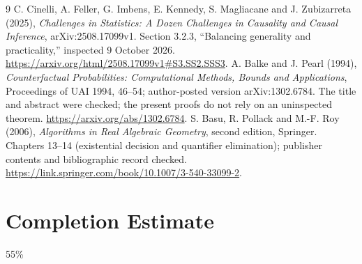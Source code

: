 \documentclass[11pt]{article}
\theoremstyle{remark}
\begin{document}
\begin{thebibliography}{9}
 C. Cinelli, A. Feller, G. Imbens, E. Kennedy, S. Magliacane and J. Zubizarreta (2025), \emph{Challenges in Statistics: A Dozen Challenges in Causality and Causal Inference}, arXiv:2508.17099v1. Section 3.2.3, ``Balancing generality and practicality,'' inspected 9 October 2026. \url{https://arxiv.org/html/2508.17099v1#S3.SS2.SSS3}.
 A. Balke and J. Pearl (1994), \emph{Counterfactual Probabilities: Computational Methods, Bounds and Applications}, Proceedings of UAI 1994, 46--54; author-posted version arXiv:1302.6784. The title and abstract were checked; the present proofs do not rely on an uninspected theorem. \url{https://arxiv.org/abs/1302.6784}.
 S. Basu, R. Pollack and M.-F. Roy (2006), \emph{Algorithms in Real Algebraic Geometry}, second edition, Springer. Chapters 13--14 (existential decision and quantifier elimination); publisher contents and bibliographic record checked. \url{https://link.springer.com/book/10.1007/3-540-33099-2}.
\end{thebibliography}

\section{Completion Estimate}
55\%
\end{document}
